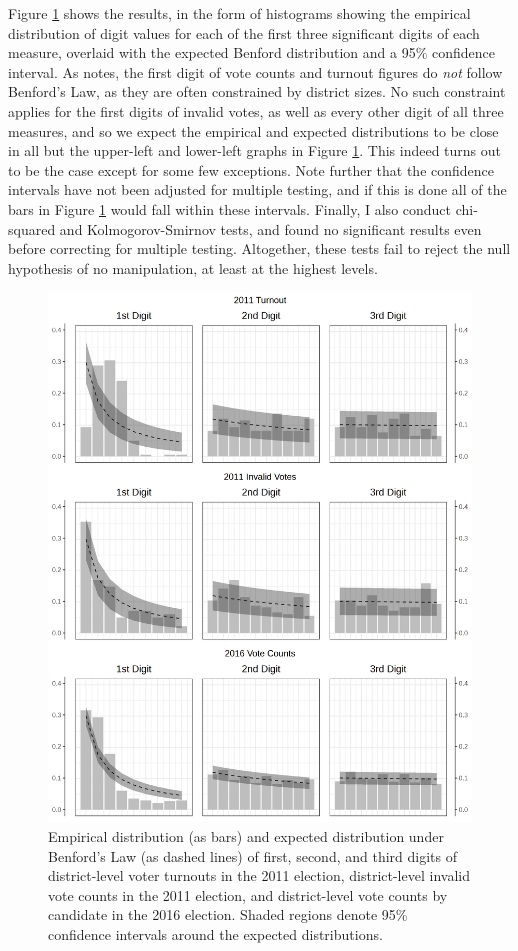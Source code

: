 \documentclass[12pt]{article}\usepackage[]{graphicx}\usepackage[]{color}
\newcommand{\1}{\mathbbm{1}}
\begin{document}
Figure \ref{fig:Benford} shows the results, in the form of histograms showing the empirical distribution of digit values for each of the first three significant digits of each measure, overlaid with the expected Benford distribution and a 95\% confidence interval. As \cite{Mebane2006} notes, the first digit of vote counts and turnout figures do \textit{not} follow Benford's Law, as they are often constrained by district sizes. No such constraint applies for the first digits of invalid votes, as well as every other digit of all three measures, and so we expect the empirical and expected distributions to be close in all but the upper-left and lower-left graphs in Figure \ref{fig:Benford}. This indeed turns out to be the case except for some few exceptions. Note further that the confidence intervals have not been adjusted for multiple testing, and if this is done all of the bars in Figure \ref{fig:Benford} would fall within these intervals. Finally, I also conduct chi-squared and Kolmogorov-Smirnov tests, and found no significant results even before correcting for multiple testing. Altogether, these tests fail to reject the null hypothesis of no manipulation, at least at the highest levels.

\begin{figure}[!htbp]
	\centering
	\includegraphics[width=\textwidth]{figure/BENFORD_DIGIT_TEST.png}
	\caption[Digit Test of Election Results]{Empirical distribution (as bars) and expected distribution under Benford's Law (as dashed lines) of first, second, and third digits of district-level voter turnouts in the 2011 election, district-level invalid vote counts in the 2011 election, and district-level vote counts by candidate in the 2016 election. Shaded regions denote 95\% confidence intervals around the expected distributions.}
	\label{fig:Benford}
\end{figure}
\end{document}
